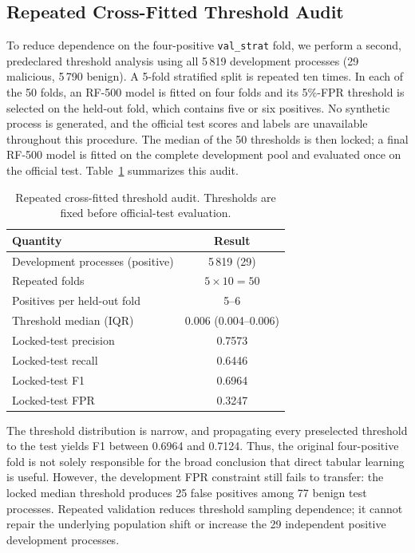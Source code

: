 \documentclass[10pt,journal,compsoc]{IEEEtran}
\begin{document}
\subsection{Repeated Cross-Fitted Threshold Audit}
\label{sec:repeated_threshold}

To reduce dependence on the four-positive \texttt{val\_strat} fold, we perform a second, predeclared threshold analysis using all 5\,819 development processes (29 malicious, 5\,790 benign). A 5-fold stratified split is repeated ten times. In each of the 50 folds, an RF-500 model is fitted on four folds and its 5\%-FPR threshold is selected on the held-out fold, which contains five or six positives. No synthetic process is generated, and the official test scores and labels are unavailable throughout this procedure. The median of the 50 thresholds is then locked; a final RF-500 model is fitted on the complete development pool and evaluated once on the official test. Table~\ref{tab:repeated_threshold} summarizes this audit.

\begin{table}[t]
\centering
\caption{Repeated cross-fitted threshold audit. Thresholds are fixed before official-test evaluation.}
\label{tab:repeated_threshold}
\begin{tabular}{lc}
\toprule
\textbf{Quantity} & \textbf{Result} \\
\midrule
Development processes (positive) & 5\,819 (29) \\
Repeated folds & $5\times10=50$ \\
Positives per held-out fold & 5--6 \\
Threshold median (IQR) & 0.006 (0.004--0.006) \\
Locked-test precision & 0.7573 \\
Locked-test recall & 0.6446 \\
Locked-test F1 & 0.6964 \\
Locked-test FPR & 0.3247 \\
\bottomrule
\end{tabular}
\end{table}

The threshold distribution is narrow, and propagating every preselected threshold to the test yields F1 between 0.6964 and 0.7124. Thus, the original four-positive fold is not solely responsible for the broad conclusion that direct tabular learning is useful. However, the development FPR constraint still fails to transfer: the locked median threshold produces 25 false positives among 77 benign test processes. Repeated validation reduces threshold sampling dependence; it cannot repair the underlying population shift or increase the 29 independent positive development processes.
\end{document}
